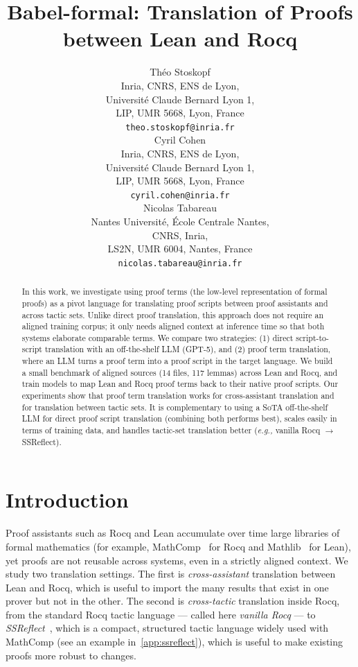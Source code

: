 \documentclass{article}
\title{Babel-formal: Translation of Proofs between Lean and Rocq}
\author{%
  Théo Stoskopf \\
  Inria, CNRS, ENS de Lyon,\\
  Université Claude Bernard Lyon 1,\\
  LIP, UMR 5668, Lyon, France \\
  \texttt{theo.stoskopf@inria.fr} \\
  \And
  Cyril Cohen \\
  Inria, CNRS, ENS de Lyon, \\
  Université Claude Bernard Lyon 1,\\
  LIP, UMR 5668, Lyon, France \\
  \texttt{cyril.cohen@inria.fr} \\
  \And
  Nicolas Tabareau \\
  Nantes Université, École Centrale Nantes, \\
  CNRS, Inria, \\
  LS2N, UMR 6004, Nantes, France \\
  \texttt{nicolas.tabareau@inria.fr}
}
\newcommand{\eg}{\emph{e.g.,}\xspace}
\begin{document}
\maketitle

\begin{abstract}
In this work, we investigate using proof terms (the low-level representation of formal proofs) as a pivot language for translating proof scripts between proof assistants and across tactic sets. Unlike direct proof translation, this approach does not require an aligned training corpus; it only needs aligned context at inference time so that both systems elaborate comparable terms. We compare two strategies: (1) direct script-to-script translation with an off-the-shelf LLM (GPT-5), and (2) proof term translation, where an LLM turns a proof term into a proof script in the target language. We build a small benchmark of aligned sources (14 files, 117 lemmas) across Lean and Rocq, and train models to map Lean and Rocq proof terms back to their native proof scripts. Our experiments show that proof term translation works for cross-assistant translation and for translation between tactic sets. It is complementary to using a SoTA off-the-shelf LLM for direct proof script translation (combining both performs best), scales easily in terms of training data, and handles tactic-set translation better (\eg vanilla Rocq $\to$ SSReflect).
\end{abstract}

\section{Introduction}

Proof assistants such as Rocq and Lean
accumulate over time large libraries of formal mathematics (for
example, MathComp~\cite{mathcomp} for Rocq and Mathlib~\cite{mathlib}
for Lean), yet proofs are not reusable across systems, even in a
strictly aligned context. We study two translation settings. The first
is \emph{cross-assistant} translation between Lean and Rocq, which is useful
to import the many results that exist in one prover but not in the other.
The second is \emph{cross-tactic} translation inside Rocq, from the
standard Rocq tactic language --- called here \textit{vanilla Rocq} --- to
\textit{SSReflect}~\cite{ssreflect}, which is a compact, structured
tactic language widely used with MathComp (see an example in~\cref{app:ssreflect}),
which is useful to make existing proofs more robust to changes.
\end{document}
